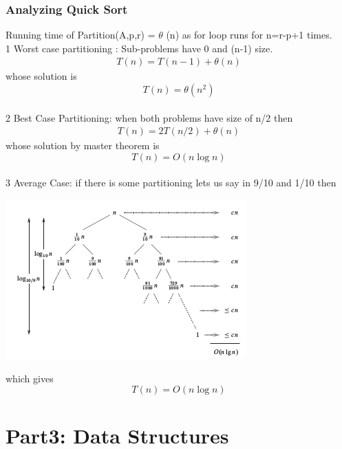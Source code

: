 \documentclass[11pt]{article}
\begin{document}
\subsubsection{Analyzing Quick Sort}
\label{sec:org10c0b3e}
Running time of Partition(A,p,r) = \(\theta\) (n) as for loop runs for n=r-p+1 times. \\
1 Worst case partitioning : Sub-problems have 0 and (n-1) size.
\begin{align*}
T(n) = T(n-1) + \theta(n)
\end{align*}
whose solution is
\begin{equation}
T(n) = \theta ( {n}^2 )
\end{equation}
\\
2 Best Case Partitioning: when both problems have size of n/2 then
\begin{align*}
T(n)=2T(n/2) + \theta (n)
\end{align*}
whose solution by master theorem is
\begin{equation}
T(n) = O (n \log n)
\end{equation}
\\
3 Average Case:
if there is some partitioning lets us say in 9/10 and 1/10 then
\begin{center}
\includegraphics[width=.9\linewidth]{./img/quicksort_analyze.png}
\end{center}
which gives
\begin{equation}
T(n) = O (n \log n)
\end{equation}

\section{Part3: Data Structures}
\label{sec:org1cff466}
\end{document}
